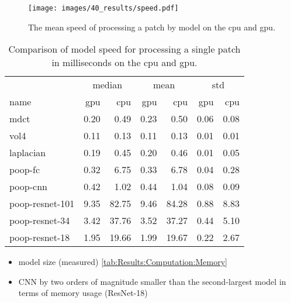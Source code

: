 \begin{figure}
    \centering
    \texttt{[image: images/40\_results/speed.pdf]}
    \caption{The mean speed of processing a patch by model on the \ac{cpu} and \ac{gpu}.}
    \label{fig:Results:Computation:Speed}
\end{figure}

\begin{table}[ht]
    \centering
    \caption{Comparison of model speed for processing a single patch in milliseconds on the \ac{cpu} and \ac{gpu}.}
    \label{tab:Results:Computation:Speed}
    \begin{tabular}{@{\extracolsep{6pt}}lrrrrrr@{}}
        \hline
        \multicolumn{1}{c}{} & \multicolumn{2}{c}{median} & \multicolumn{2}{c}{mean} & \multicolumn{2}{c}{std} \\
        \cline{2-3}\cline{4-5}\cline{6-7}
        name & \acs{gpu} & \acs{cpu} & \acs{gpu} & \acs{cpu} & \acs{gpu} & \acs{cpu} \\
        \hline
        \acs{mdct}                      & 0.20 &  0.49 & 0.23 &  0.50 & 0.06 & 0.08 \\
        \acs{vol4}                      & 0.11 &  0.13 & 0.11 &  0.13 & 0.01 & 0.01 \\
        \acs{laplacian}                 & 0.19 &  0.45 & 0.20 &  0.46 & 0.01 & 0.05 \\
        \hline
        \acs{poop}-\acs{fc}             & 0.32 &  6.75 & 0.33 &  6.78 & 0.04 & 0.28 \\
        \acs{poop}-\acs{cnn}            & 0.42 &  1.02 & 0.44 &  1.04 & 0.08 & 0.09 \\
        \acs{poop}-\acs{resnet}-101     & 9.35 & 82.75 & 9.46 & 84.28 & 0.88 & 8.83 \\
        \acs{poop}-\acs{resnet}-34      & 3.42 & 37.76 & 3.52 & 37.27 & 0.44 & 5.10 \\
        \acs{poop}-\acs{resnet}-18      & 1.95 & 19.66 & 1.99 & 19.67 & 0.22 & 2.67 \\
    \end{tabular}
\end{table}


\begin{itemize}
    \item model size (measured) \autoref{tab:Results:Computation:Memory}
    \item CNN by two orders of magnitude smaller than the second-largest model in terms of memory usage (ResNet-18)
\end{itemize}

